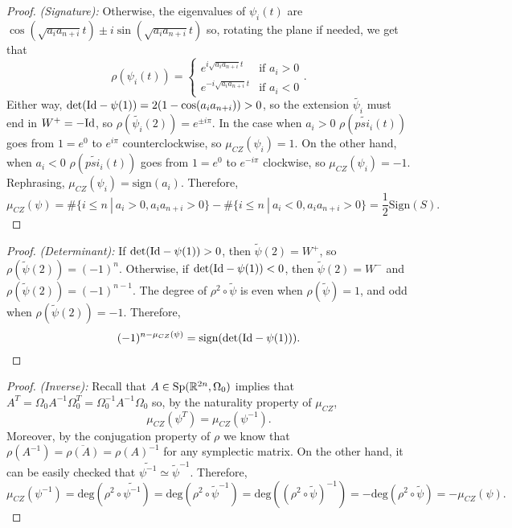 \begin{proof} {\it (Signature):}
Otherwise, the eigenvalues of $\psi_i(t)$ are $\cos(\sqrt{a_ia_{n+i}}t) \pm i \sin(\sqrt{a_ia_{n+i}}t)$ so, rotating the plane if needed, we get that
\[ \rho(\psi_i(t)) = \left\{ \begin{array}{lc} e^{i \sqrt{a_ia_{n+i}} t} & \text{if } a_i > 0 \\ e^{- i \sqrt{a_ia_{n+i}} t} & \text{if } a_i < 0 \end{array} \right. .\]
Either way, $\text{det}(\text{Id} - \psi(1)) = 2(1-\cos(a_ia_{n+i})) > 0$, so the extension $\widetilde{\psi_i}$ must end in $W^+ = - \text{Id}$, so $\rho(\widetilde{\psi_i}(2)) = e^{\pm i \pi}$. In the case when $a_i > 0$ $\rho(\widetilde{psi_i}(t))$ goes from $1=e^0$ to $e^{i\pi}$ counterclockwise, so $\mu_{CZ}(\psi_i) = 1$. On the other hand, when $a_i < 0$ $\rho(\widetilde{psi_i}(t))$ goes from $1=e^0$ to $e^{-i\pi}$ clockwise, so $\mu_{CZ}(\psi_i) = -1$. Rephrasing, $\mu_{CZ}(\psi_i) = \text{sign}(a_i)$. Therefore,
\[\mu_{CZ}(\psi) = \# \{ i \leq n \ | \ a_i > 0, a_ia_{n+i} > 0 \} - \# \{ i \leq n \ | \ a_i < 0, a_ia_{n+i} > 0 \} = \frac12 \text{Sign}(S) .\]
\end{proof}

\begin{proof} {\it (Determinant):} If $\text{det}(\text{Id} - \psi(1)) > 0$, then $\widetilde{\psi}(2) = W^+$, so $\rho(\widetilde{\psi}(2)) = (-1)^n$. Otherwise, if $\text{det}(\text{Id} - \psi(1)) < 0$, then $\widetilde{\psi}(2) = W^-$ and $\rho(\widetilde{\psi}(2)) = (-1)^{n-1}$. The degree of $\rho^2 \circ \widetilde{\psi}$ is even when $\rho(\widetilde{\psi}) = 1$, and odd when $\rho(\widetilde{\psi}(2)) = -1$. Therefore,
\[(-1)^{n-\mu_{CZ}(\psi)} = \text{sign} ( \text{det}(\text{Id} - \psi(1))) .\]
\end{proof}

\begin{proof} {\it (Inverse):} Recall that $A \in \text{Sp}(\mathbb{R}^{2n},\Omega_0)$ implies that $A^T = \Omega_0 A^{-1} \Omega_0^T = \Omega_0^{-1} A^{-1} \Omega_0$ so, by the naturality property of $\mu_{CZ}$,
\[\mu_{CZ}(\psi^T) = \mu_{CZ}(\psi^{-1}) .\]
Moreover, by the conjugation property of $\rho$ we know that $\rho(A^{-1}) = \overline{\rho(A)} = \rho(A)^{-1}$ for any symplectic matrix. On the other hand, it can be easily checked that $\widetilde{\psi^{-1}} \simeq \widetilde{\psi}^{-1}$. Therefore,
\[\mu_{CZ}(\psi^{-1}) = \text{deg}(\rho^2 \circ \widetilde{\psi^{-1}}) = \text{deg}(\rho^2 \circ \widetilde{\psi}^{-1}) = \text{deg}((\rho^2 \circ \widetilde{\psi})^{-1}) = - \text{deg}(\rho^2 \circ \widetilde{\psi}) = - \mu_{CZ}(\psi) .\]
\end{proof}

